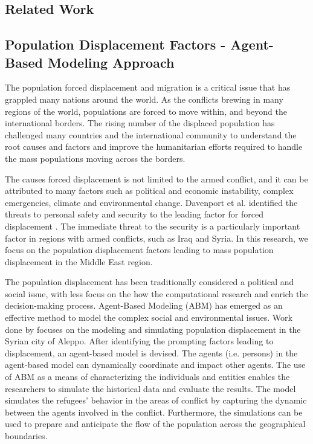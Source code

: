 \begin{appendices}
\chapter{Related Work}

\section{Population Displacement Factors  - Agent-Based Modeling Approach}
The population forced displacement and migration is a critical issue that has grappled many nations around the world. As the conflicts brewing in many regions of the world, populations are forced to move within, and beyond the international borders. The rising number of the displaced population has challenged many countries and the international community to understand the root causes and factors and improve the humanitarian efforts required to handle the mass populations moving across the borders. 

The causes forced displacement is not limited to the armed conflict, and it can be attributed to many factors such as political and economic instability, complex emergencies, climate and environmental change. Davenport et al. identified the threats to personal safety and security to the leading factor for forced displacement \cite{davenport2003}. The immediate threat to the security is a particularly important factor in regions with armed conflicts, such as Iraq and Syria. In this research, we focus on the population displacement factors leading to mass population displacement in the Middle East region. 

The population displacement has been traditionally considered a political and social issue, with less focus on the how the computational research and enrich the decision-making process. Agent-Based Modeling (ABM) has emerged as an effective method to model the complex social and environmental issues. Work done by \cite{Sokolowski2014} focuses on the modeling and simulating population displacement in the Syrian city of Aleppo. After identifying the prompting factors leading to displacement, an agent-based model is devised. The agents (i.e. persons) in the agent-based model can dynamically coordinate and impact other agents. The use of ABM as a means of characterizing the individuals and entities enables the researchers to simulate the historical data and evaluate the results. The model simulates the refugees' behavior in the areas of conflict by capturing the dynamic between the agents involved in the conflict. Furthermore, the simulations can be used to prepare and anticipate the flow of the population across the geographical boundaries.


\end{appendices}
